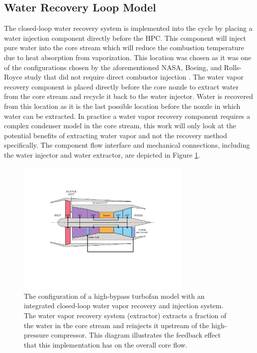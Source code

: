 \documentclass[conf]{new-aiaa}
\begin{document}
\subsection{Water Recovery Loop Model}
The closed-loop water recovery system is implemented into the cycle by placing a water injection component directly before the HPC.
This component will inject pure water into the core stream which will reduce the combustion temperature due to heat absorption from vaporization.
This location was chosen as it was one of the configurations chosen by the aforementioned NASA, Boeing, and Rolls-Royce study that did not require direct combustor injection \cite{Daggett2010}.
The water vapor recovery component is placed directly before the core nozzle to extract water from the core stream and recycle it back to the water injector.
Water is recovered from this location as it is the last possible location before the nozzle in which water can be extracted.
In practice a water vapor recovery component requires a complex condenser model in the core stream, this work will only look at the potential benefits of extracting water vapor and not the recovery method specifically.
The component flow interface and mechanical connections, including the water injector and water extractor, are depicted in Figure \ref{fig:n3_cycle}.

\begin{figure}[hbt!]
    \centering
    \includegraphics[width=0.75\textwidth]{turbofan_wvr.pdf}
    \caption{
        The configuration of a high-bypass turbofan model with an integrated closed-loop water vapor recovery and injection system.
        The water vapor recovery system (extractor) extracts a fraction of the water in the core stream and reinjects it upstream of the high-pressure compressor.
        This diagram illustrates the feedback effect that this implementation has on the overall core flow.}
    \label{fig:n3_cycle}
\end{figure}
\end{document}
